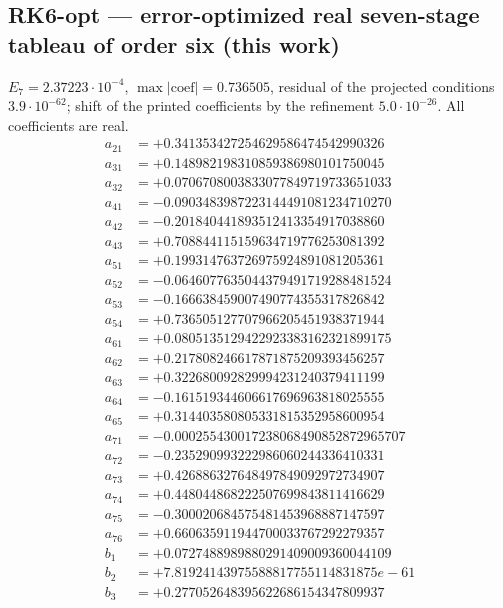 \subsection*{RK6-opt --- error-optimized real seven-stage tableau of order six (this work)}
$E_{7}=2.37223\cdot10^{-4}$, $\max|\text{coef}|=0.736505$, residual of the projected conditions $3.9\cdot10^{-62}$; shift of the printed coefficients by the refinement $5.0\cdot10^{-26}$. All coefficients are real.
{\small
\begin{align*}
a_{21} &= +0.341353427254629586474542990326\\
a_{31} &= +0.148982198310859386980101750045\\
a_{32} &= +0.0706708003833077849719733651033\\
a_{41} &= -0.0903483987223144491081234710270\\
a_{42} &= -0.201840441893512413354917038860\\
a_{43} &= +0.708844115159634719776253081392\\
a_{51} &= +0.199314763726975924891081205361\\
a_{52} &= -0.0646077635044379491719288481524\\
a_{53} &= -0.166638459007490774355317826842\\
a_{54} &= +0.736505127707966205451938371944\\
a_{61} &= +0.0805135129422923383162321899175\\
a_{62} &= +0.217808246617871875209393456257\\
a_{63} &= +0.322680092829994231240379411199\\
a_{64} &= -0.161519344606617696963818025555\\
a_{65} &= +0.314403580805331815352958600954\\
a_{71} &= -0.000255430017238068490852872965707\\
a_{72} &= -0.235290993222986060244336410331\\
a_{73} &= +0.426886327648497849092972734907\\
a_{74} &= +0.448044868222507699843811416629\\
a_{75} &= -0.300020684575481453968887147597\\
a_{76} &= +0.660635911944700033767292279357\\[1mm]
b_{1} &= +0.0727488989880291409009360044109\\
b_{2} &= +7.81924143975588817755114831875e-61\\
b_{3} &= +0.277052648395622686154347809937\\

\end{align*}}
